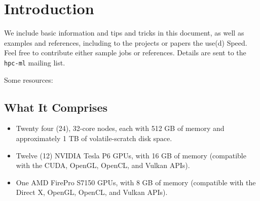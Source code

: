 \documentclass{easychair}
\begin{document}
\tableofcontents
\clearpage

\section{Introduction}

We include basic information and tips and tricks in this document,
as well as examples and references, including to the projects or
papers the use(d) Speed. Feel free to contribute either sample jobs
or references. Details are sent to the \texttt{hpc-ml} mailing list.

Some resources:


\subsection{What It Comprises}

\begin{itemize}
\item
Twenty four (24), 32-core nodes, each with 512 GB of memory and approximately 1 TB of volatile-scratch disk space. 
\item
Twelve (12) NVIDIA Tesla P6 GPUs, with 16 GB of memory (compatible with the CUDA, OpenGL, OpenCL, and Vulkan APIs). 
\item
One AMD FirePro S7150 GPUs, with 8 GB of memory (compatible with the Direct X, OpenGL, OpenCL, and Vulkan APIs). 
\end{itemize}
\end{document}
